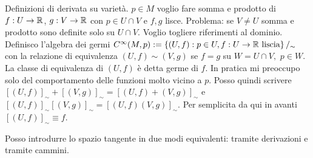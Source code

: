 Definizioni di derivata su varietà. 
$p\in M$ voglio fare somma e prodotto di $f:U\rightarrow\mathbb{R}$,
$g:V\rightarrow\mathbb{R}$ con $p\in U\cap V$ e $f,g$ lisce. Problema: 
se $V\neq U$ somma e prodotto sono definite solo su $U\cap V$.
Voglio togliere riferimenti al dominio. 
Definisco l'algebra dei germi $C^\infty(M,p):=\left\{ (U,f): p\in
U, f:U\rightarrow\mathbb{R}\text{ liscia} \right\}/_\sim$ con la relazione
di equivalenza $(U,f)\sim(V,g)$ se $f=g$ su $W=U\cap V,\,\,p\in W$.
La classe di equivalenza di $(U,f)$ è detta germe di $f$. In pratica
mi preoccupo solo del comportamento delle funzioni molto vicino a
$p$. Posso quindi scrivere
$[(U,f)]_\sim+[(V,g)]_\sim=[(U,f)+(V,g)]_\sim$ e
$[(U,f)]_\sim[(V,g)]_\sim=[(U,f)(V,g)]_\sim$. Per semplicita da qui in avanti
$[(U,f)]_\sim\equiv f$. 

Posso introdurre lo spazio tangente in due modi equivalenti:
tramite derivazioni e tramite cammini.


